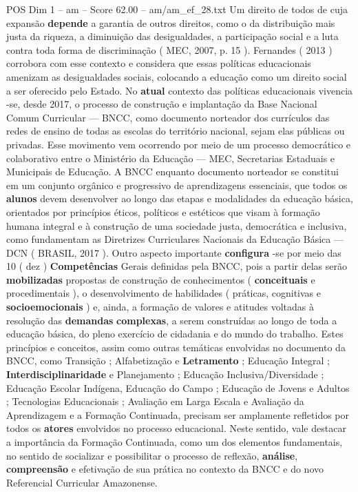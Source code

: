 \begin{textsample}{POS Dim 1 – am – Score 62.00 – am/am\_ef\_28.txt}
Um direito de todos de cuja expansão \textbf{depende} a garantia de outros direitos, como o da distribuição mais justa da riqueza, a diminuição das desigualdades, a participação social e a luta contra toda forma de discriminação ( MEC, 2007, p. 15 ).
Fernandes ( 2013 ) corrobora com esse contexto e considera que essas políticas educacionais amenizam as desigualdades sociais, colocando a educação como um direito social a ser oferecido pelo Estado.
No \textbf{atual} contexto das políticas educacionais vivencia -se, desde 2017, o processo de construção e implantação da Base Nacional Comum Curricular — BNCC, como documento norteador dos currículos das redes de ensino de todas as escolas do território nacional, sejam elas públicas ou privadas.
Esse movimento vem ocorrendo por meio de um processo democrático e colaborativo entre o Ministério da Educação — MEC, Secretarias Estaduais e Municipais de Educação.
A BNCC enquanto documento norteador se constitui em um conjunto orgânico e progressivo de aprendizagens essenciais, que todos os \textbf{alunos} devem desenvolver ao longo das etapas e modalidades da educação básica, orientados por princípios éticos, políticos e estéticos que visam à formação humana integral e à construção de uma sociedade justa, democrática e inclusiva, como fundamentam as Diretrizes Curriculares Nacionais da Educação Básica — DCN ( BRASIL, 2017 ).
Outro aspecto importante \textbf{configura} -se por meio das 10 ( dez ) \textbf{Competências} Gerais definidas pela BNCC, pois a partir delas serão \textbf{mobilizadas} propostas de construção de conhecimentos ( \textbf{conceituais} e procedimentais ), o desenvolvimento de habilidades ( práticas, cognitivas e \textbf{socioemocionais} ) e, ainda, a formação de valores e atitudes voltadas à resolução das \textbf{demandas} \textbf{complexas}, a serem construídas ao longo de toda a educação básica, do pleno exercício de cidadania e do mundo do trabalho.
Estes princípios e conceitos, assim como outras temáticas envolvidas no documento da BNCC, como Transição ; Alfabetização e \textbf{Letramento} ; Educação Integral ; \textbf{Interdisciplinaridade} e Planejamento ; Educação Inclusiva/Diversidade ; Educação Escolar Indígena, Educação do Campo ; Educação de Jovens e Adultos ; Tecnologias Educacionais ; Avaliação em Larga Escala e Avaliação da Aprendizagem e a Formação Continuada, precisam ser amplamente refletidos por todos os \textbf{atores} envolvidos no processo educacional.
Neste sentido, vale destacar a importância da Formação Continuada, como um dos elementos fundamentais, no sentido de socializar e possibilitar o processo de reflexão, \textbf{análise}, \textbf{compreensão} e efetivação de sua prática no contexto da BNCC e do novo Referencial Curricular Amazonense.

\end{textsample}

